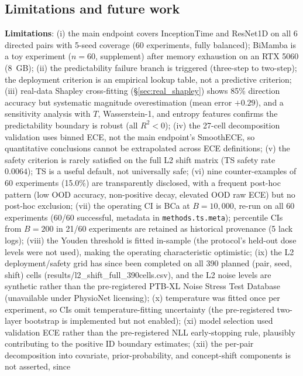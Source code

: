 \documentclass[review,12pt,nonatbib]{elsarticle}
\begin{document}
\subsection{Limitations and future work}
\textbf{Limitations}: (i) the main endpoint covers InceptionTime and
ResNet1D on all 6 directed pairs with 5-seed coverage (60 experiments,
fully balanced); BiMamba is a toy experiment ($n=60$, supplement) after
memory exhaustion on an RTX 5060 (8~GB); (ii) the predictability failure
branch is triggered (three-step to two-step); the deployment criterion
is an empirical lookup table, not a predictive criterion; (iii)
real-data Shapley cross-fitting (\S\ref{sec:real_shapley}) shows 85\%
direction accuracy but systematic magnitude overestimation (mean error
$+0.29$), and a sensitivity analysis with $T$, Wasserstein-1, and
entropy features confirms the predictability boundary is robust (all
$R^2 < 0$); (iv) the 27-cell decomposition validation uses binned ECE,
not the main endpoint's SmoothECE, so quantitative conclusions cannot be
extrapolated across ECE definitions; (v) the safety criterion is rarely
satisfied on the full L2 shift matrix (TS safety rate $0.0064$); TS is a
useful default, not universally safe; (vi) nine counter-examples of 60
experiments (15.0\%) are transparently disclosed, with a frequent post-hoc pattern
(low OOD accuracy, non-positive decay, elevated OOD raw ECE) but no
post-hoc exclusion; (vii) the operating CI is BCa at $B=10{,}000$,
re-run on all 60 experiments (60/60 successful, metadata in
\texttt{methods.ts.meta}); percentile CIs from $B=200$ in 21/60
experiments are retained as historical provenance (5 lack logs); (viii)
the Youden threshold is fitted in-sample (the protocol's held-out dose
levels were not used), making the operating characteristic optimistic;
(ix) the L2 deployment/safety grid has since been completed on all 390
planned (pair, seed, shift) cells (results/l2\_shift\_full\_390cells.csv),
and the L2 noise
levels are synthetic rather than the pre-registered PTB-XL Noise Stress
Test Database (unavailable under PhysioNet licensing); (x) temperature
was fitted once per experiment, so CIs omit temperature-fitting
uncertainty (the pre-registered two-layer bootstrap is implemented but
not enabled); (xi) model selection used validation ECE rather than the pre-registered
NLL early-stopping rule, plausibly contributing to the positive ID
boundary estimates; (xii) the per-pair decomposition into covariate,
prior-probability, and concept-shift components is not asserted, since
\end{document}
